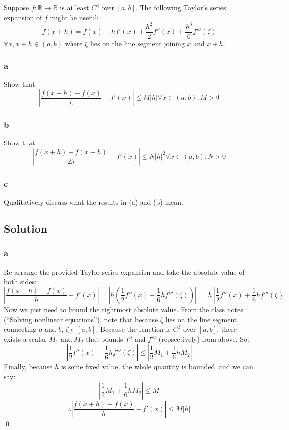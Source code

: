 \documentclass[11pt]{report}
\theoremstyle{definition}
\begin{document}
Suppose $f : \mathbb{R}\rightarrow\mathbb{R}$ is at least $C^3$ over $[a,b]$. The following
Taylor's series expansion of $f$ might be useful:
\[
	f(x+h) = f(x) + hf'(x) + \frac{h^2}{2}f''(x)+\frac{h^3}{6}f'''(\zeta)
\]
$\forall x, x+h\in(a,b)$ where $\zeta$ lies on the line segment joining $x$ and $x+h$.

\subsubsection*{a}
Show that
\[
	\left|
	\frac{f(x+h)-f(x)}{h}-f'(x)
	\right|
	\leq M|h|
	\forall x\in(a,b), M>0
\]

\subsubsection*{b}
Show that
\[
	\left|
	\frac{f(x+h)-f(x-h)}{2h}-f'(x)
	\right|
	\leq N|h|^2
	\forall x\in(a,b), N>0
\]
\subsubsection*{c}
Qualitatively discuss what the results in (a) and (b) mean.

\subsection*{Solution}
\subsubsection*{a}
Re-arrange the provided Taylor series expansion and take the absolute value of both sides:
\[
	\left|\frac{f(x+h)-f(x)}{h} - f'(x)\right|
	= \left|h(\frac{1}{2}f''(x)+\frac{1}{6}hf'''(\zeta))\right|
	= \left|h\right|\left|\frac{1}{2}f''(x)+\frac{1}{6}hf'''(\zeta)\right|
\]
Now we just need to bound the rightmost absolute value. From the class notes
(``Solving nonlinear equations''), note that because $\zeta$ lies on the line
segment connecting $a$ and $b$, $\zeta\in[a,b]$. Because the function is $C^3$
over $[a,b]$, there exists a scalar $M_1$ and $M_2$ that bounds $f''$ and $f'''$
(repsectively) from above. So:
\[
	\left|\frac{1}{2}f''(x)+\frac{1}{6}hf'''(\zeta)\right|
	\leq\left|\frac{1}{2}M_1 + \frac{1}{6}hM_2\right|
\]
Finally, because $h$ is some fixed value, the whole quantity is bounded, and we can say:
\[
	\left|\frac{1}{2}M_1 + \frac{1}{6}hM_2\right|
	\leq M
\]
\[
	\therefore
	\left|\frac{f(x+h)-f(x)}{h} - f'(x)\right|
	\leq M|h|
\]
\qed
\end{document}
